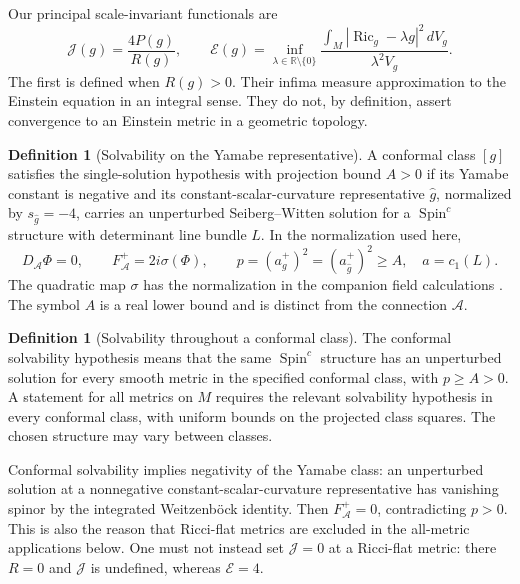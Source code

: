 \documentclass[11pt,a4paper]{article}
\theoremstyle{definition}
\newtheorem{definition}[theorem]{Definition}
\theoremstyle{remark}
\newcommand{\Ric}{\operatorname{Ric}}
\newcommand{\Sc}{\operatorname{Spin}^{c}}
\newcommand{\J}{\mathcal J}
\newcommand{\E}{\mathcal E}
\newcommand{\Acal}{\mathcal A}
\begin{document}
Our principal scale-invariant functionals are
\begin{equation}
 \J(g)=\frac{4P(g)}{R(g)},\qquad
 \E(g)=\inf_{\lambda\in\mathbb R\setminus\{0\}}
 \frac{\int_M|\Ric_g-\lambda g|^2\,dV_g}{\lambda^2V_g}.
 \label{eq:defects}
\end{equation}
The first is defined when $R(g)>0$. Their infima measure approximation to the Einstein equation in an integral sense. They do not, by definition, assert convergence to an Einstein metric in a geometric topology.

\begin{definition}[Solvability on the Yamabe representative]\label{def:one}
A conformal class $[g]$ satisfies the single-solution hypothesis with projection bound $A>0$ if its Yamabe constant is negative and its constant-scalar-curvature representative $\widehat g$, normalized by $s_{\widehat g}=-4$, carries an unperturbed Seiberg--Witten solution for a $\Sc$ structure with determinant line bundle $L$. In the normalization used here,
\begin{equation}
 D_{\Acal}\Phi=0,\qquad F_{\Acal}^+=2i\sigma(\Phi),\qquad
 p=(a_g^+)^2=(a_{\widehat g}^+)^2\ge A,
 \quad a=c_1(L).
 \label{eq:SW}
\end{equation}
The quadratic map $\sigma$ has the normalization in the companion field calculations \cite{Parameter}. The symbol $A$ is a real lower bound and is distinct from the connection $\Acal$.
\end{definition}

\begin{definition}[Solvability throughout a conformal class]\label{def:full}
The conformal solvability hypothesis means that the same $\Sc$ structure has an unperturbed solution for every smooth metric in the specified conformal class, with $p\ge A>0$. A statement for all metrics on $M$ requires the relevant solvability hypothesis in every conformal class, with uniform bounds on the projected class squares. The chosen structure may vary between classes.
\end{definition}

Conformal solvability implies negativity of the Yamabe class: an unperturbed solution at a nonnegative constant-scalar-curvature representative has vanishing spinor by the integrated Weitzenb\"ock identity. Then $F^+_{\Acal}=0$, contradicting $p>0$. This is also the reason that Ricci-flat metrics are excluded in the all-metric applications below. One must not instead set $\J=0$ at a Ricci-flat metric: there $R=0$ and $\J$ is undefined, whereas $\E=4$.
\end{document}
